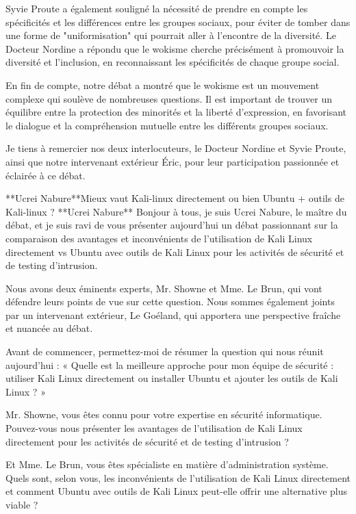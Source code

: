Syvie Proute a également souligné la nécessité de prendre en compte les spécificités et les différences entre les groupes sociaux, pour éviter de tomber dans une forme de "uniformisation" qui pourrait aller à l'encontre de la diversité. Le Docteur Nordine a répondu que le wokisme cherche précisément à promouvoir la diversité et l'inclusion, en reconnaissant les spécificités de chaque groupe social.

En fin de compte, notre débat a montré que le wokisme est un mouvement complexe qui soulève de nombreuses questions. Il est important de trouver un équilibre entre la protection des minorités et la liberté d'expression, en favorisant le dialogue et la compréhension mutuelle entre les différents groupes sociaux.

Je tiens à remercier nos deux interlocuteurs, le Docteur Nordine et Syvie Proute, ainsi que notre intervenant extérieur Éric, pour leur participation passionnée et éclairée à ce débat.


**Ucrei Nabure**Mieux vaut Kali-linux directement ou bien Ubuntu + outils de Kali-linux ?
**Ucrei Nabure**
Bonjour à tous, je suis Ucrei Nabure, le maître du débat, et je suis ravi de vous présenter aujourd'hui un débat passionnant sur la comparaison des avantages et inconvénients de l'utilisation de Kali Linux directement vs Ubuntu avec outils de Kali Linux pour les activités de sécurité et de testing d'intrusion.

Nous avons deux éminents experts, Mr. Showne et Mme. Le Brun, qui vont défendre leurs points de vue sur cette question. Nous sommes également joints par un intervenant extérieur, Le Goéland, qui apportera une perspective fraîche et nuancée au débat.

Avant de commencer, permettez-moi de résumer la question qui nous réunit aujourd'hui : « Quelle est la meilleure approche pour mon équipe de sécurité : utiliser Kali Linux directement ou installer Ubuntu et ajouter les outils de Kali Linux ? »

Mr. Showne, vous êtes connu pour votre expertise en sécurité informatique. Pouvez-vous nous présenter les avantages de l'utilisation de Kali Linux directement pour les activités de sécurité et de testing d'intrusion ?

Et Mme. Le Brun, vous êtes spécialiste en matière d'administration système. Quels sont, selon vous, les inconvénients de l'utilisation de Kali Linux directement et comment Ubuntu avec outils de Kali Linux peut-elle offrir une alternative plus viable ?


